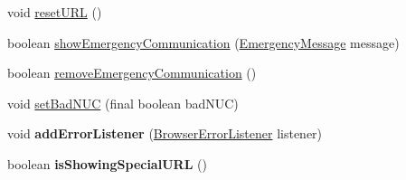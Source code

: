 \begin{DoxyCompactItemize}
\item 
void \hyperlink{classgov_1_1fnal_1_1ppd_1_1dd_1_1display_1_1client_1_1ConnectionToBrowserInstance_a43c95f4a9d8241a513fc1d4074748b06}{reset\-U\-R\-L} ()
\item 
boolean \hyperlink{classgov_1_1fnal_1_1ppd_1_1dd_1_1display_1_1client_1_1ConnectionToBrowserInstance_ad0e8239b4a95ac152c5746fb8249dfca}{show\-Emergency\-Communication} (\hyperlink{classgov_1_1fnal_1_1ppd_1_1dd_1_1emergency_1_1EmergencyMessage}{Emergency\-Message} message)
\item 
boolean \hyperlink{classgov_1_1fnal_1_1ppd_1_1dd_1_1display_1_1client_1_1ConnectionToBrowserInstance_a05ca59c4a52ee2d972cbd57dfd62c880}{remove\-Emergency\-Communication} ()
\item 
void \hyperlink{classgov_1_1fnal_1_1ppd_1_1dd_1_1display_1_1client_1_1ConnectionToBrowserInstance_a8d781733f348ac915b8ba330e2c5ec6b}{set\-Bad\-N\-U\-C} (final boolean bad\-N\-U\-C)
\item 
\hypertarget{classgov_1_1fnal_1_1ppd_1_1dd_1_1display_1_1client_1_1ConnectionToBrowserInstance_aa2c91771874c22df3f0f316f344f9d0f}{void {\bfseries add\-Error\-Listener} (\hyperlink{interfacegov_1_1fnal_1_1ppd_1_1dd_1_1display_1_1client_1_1BrowserErrorListener}{Browser\-Error\-Listener} listener)}\label{classgov_1_1fnal_1_1ppd_1_1dd_1_1display_1_1client_1_1ConnectionToBrowserInstance_aa2c91771874c22df3f0f316f344f9d0f}

\item 
\hypertarget{classgov_1_1fnal_1_1ppd_1_1dd_1_1display_1_1client_1_1ConnectionToBrowserInstance_a6e969328f1fcd309a1a46bbe737eb6cf}{boolean {\bfseries is\-Showing\-Special\-U\-R\-L} ()}\label{classgov_1_1fnal_1_1ppd_1_1dd_1_1display_1_1client_1_1ConnectionToBrowserInstance_a6e969328f1fcd309a1a46bbe737eb6cf}

\end{DoxyCompactItemize}

